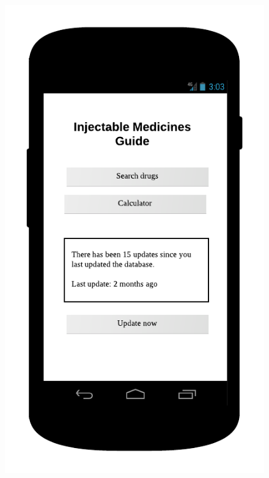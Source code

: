 \begin{figure}
\centering
\begin{minipage}{.5\textwidth}
  \centering
  \includegraphics[width=.7\linewidth]{Images/mockups/main.png}
\end{minipage}%
\begin{minipage}{.5\textwidth}
  \centering

\end{minipage}
\end{figure}
